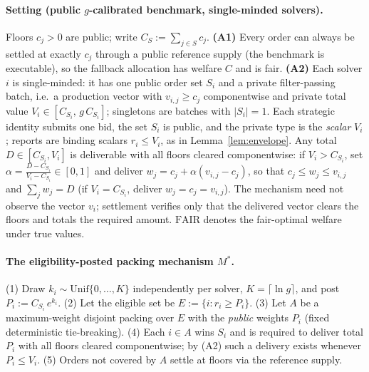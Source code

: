 \documentclass[11pt]{article}
\theoremstyle{remark}
\newcommand{\FAIR}{\mathrm{FAIR}}
\begin{document}
\paragraph{Setting (public $g$-calibrated benchmark, single-minded
solvers).}
Floors $c_j>0$ are public; write $C_S:=\sum_{j\in S}c_j$.
\textbf{(A1)} Every order can always be settled at exactly $c_j$ through a
public reference supply (the benchmark is executable), so the fallback
allocation has welfare $C$ and is fair. \textbf{(A2)} Each solver $i$ is
single-minded: it has one public order set $S_i$ and a private
filter-passing batch, i.e.\ a production vector with $v_{i,j}\ge c_j$
componentwise and private total value $V_i\in[C_{S_i},\,g\,C_{S_i}]$;
singletons are batches with $|S_i|=1$. Each strategic identity submits one
bid, the set $S_i$ is public, and the private type is the \emph{scalar}
$V_i$; reports are binding scalars $r_i\le V_i$, as in
Lemma~\ref{lem:envelope}. Any total $D\in[C_{S_i},V_i]$ is deliverable
with all floors cleared componentwise: if $V_i>C_{S_i}$, set
$\alpha=\frac{D-C_{S_i}}{V_i-C_{S_i}}\in[0,1]$ and deliver
$w_j=c_j+\alpha(v_{i,j}-c_j)$, so that $c_j\le w_j\le v_{i,j}$ and
$\sum_j w_j=D$ (if $V_i=C_{S_i}$, deliver $w_j=c_j=v_{i,j}$). The
mechanism need not observe the vector $v_i$; settlement verifies only
that the delivered vector clears the floors and totals the required
amount. $\FAIR$ denotes the fair-optimal welfare under true values.

\paragraph{The eligibility-posted packing mechanism $M^\ast$.}
(1) Draw $k_i\sim\mathrm{Unif}\{0,\dots,K\}$ independently per solver,
$K=\lceil\ln g\rceil$, and post $P_i:=C_{S_i}\,e^{k_i}$.
(2) Let the eligible set be $E:=\{i:r_i\ge P_i\}$.
(3) Let $A$ be a maximum-weight disjoint packing over $E$ with the
\emph{public} weights $P_i$ (fixed deterministic tie-breaking).
(4) Each $i\in A$ wins $S_i$ and is required to deliver total $P_i$ with
all floors cleared componentwise; by (A2) such a delivery exists whenever
$P_i\le V_i$.
(5) Orders not covered by $A$ settle at floors via the reference supply.
\end{document}
